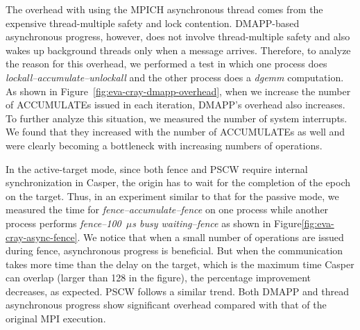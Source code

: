 The overhead with using the MPICH asynchronous thread comes from the expensive
thread-multiple safety and lock contention.  DMAPP-based asynchronous
progress, however, does not involve thread-multiple safety and also
wakes up background threads only when a message arrives.  Therefore, to
analyze the reason for this overhead, we performed a test in which one
process does \emph{lockall--accumulate--unlockall} and the other
process does a \textit{dgemm} computation.  As shown in
Figure~\ref{fig:eva-cray-dmapp-overhead}, when we increase the number
of ACCUMULATEs issued in each iteration, DMAPP's overhead also
increases.  To further analyze this situation, we measured the number of system
interrupts. We found that they increased with the number of
ACCUMULATEs as well and were clearly becoming a bottleneck with
increasing numbers of operations.


In the active-target mode, since both fence and PSCW require internal
synchronization in Casper, the origin has to wait for the completion
of the epoch on the target.  Thus, in an experiment similar to that for
the passive mode, we measured the time for
\emph{fence--accumulate--fence} on one process while another process
performs \emph{fence--100~$\mu$s busy waiting--fence} as shown in
Figure\ref{fig:eva-cray-async-fence}.  We notice that when a small
number of operations are issued during fence, asynchronous progress is
beneficial.  But when the communication takes more time than the delay
on the target, which is the maximum time Casper can overlap (larger
than 128 in the figure), the percentage improvement decreases, as
expected.  PSCW follows a similar trend. Both DMAPP and
thread asynchronous progress show significant overhead compared with that of the original
MPI execution.

